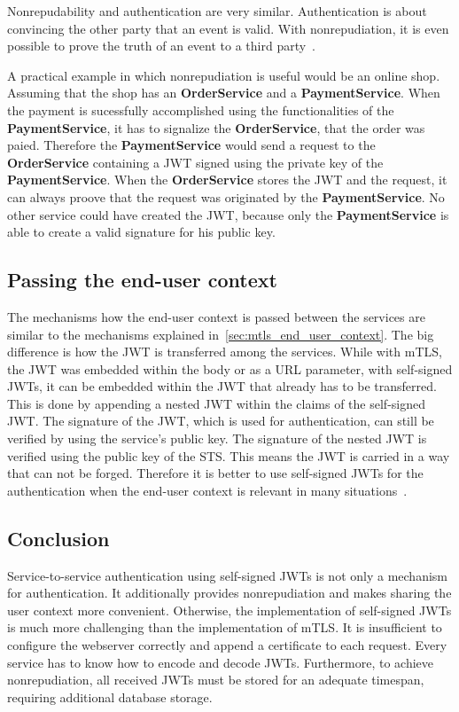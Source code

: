 Nonrepudability and authentication are very similar.
Authentication is about convincing the other party that an event is valid.
With nonrepudiation, it is even possible to prove the truth of an event to a third party~\cite{wu20131200}.

A practical example in which nonrepudiation is useful would be an online shop.
Assuming that the shop has an \textbf{OrderService} and a \textbf{PaymentService}.
When the payment is sucessfully accomplished using the functionalities of the \textbf{PaymentService}, it has to signalize the \textbf{OrderService}, that the order was paied.
Therefore the \textbf{PaymentService} would send a request to the \textbf{OrderService} containing a JWT signed using the private key of the \textbf{PaymentService}.
When the \textbf{OrderService} stores the JWT and the request, it can always proove that the request was originated by the \textbf{PaymentService}.
No other service could have created the JWT, because only the \textbf{PaymentService} is able to create a valid signature for his public key.

\subsection{Passing the end-user context}
The mechanisms how the end-user context is passed between the services are similar to the mechanisms explained in~\ref{sec:mtls_end_user_context}.
The big difference is how the JWT is transferred among the services.
While with mTLS, the JWT was embedded within the body or as a URL parameter, with self-signed JWTs, it can be embedded within the JWT that already has to be transferred.
This is done by appending a nested JWT within the claims of the self-signed JWT.
The signature of the JWT, which is used for authentication, can still be verified by using the service's public key.
The signature of the nested JWT is verified using the public key of the STS.
This means the JWT is carried in a way that can not be forged.
Therefore it is better to use self-signed JWTs for the authentication when the end-user context is relevant in many situations~\cite{dias2020microservices}.

\subsection{Conclusion}
Service-to-service authentication using self-signed JWTs is not only a mechanism for authentication. It additionally provides nonrepudiation and makes sharing the user context more convenient. 
Otherwise, the implementation of self-signed JWTs is much more challenging than the implementation of mTLS.
It is insufficient to configure the webserver correctly and append a certificate to each request.
Every service has to know how to encode and decode JWTs.
Furthermore, to achieve nonrepudiation, all received JWTs must be stored for an adequate timespan, requiring additional database storage.


